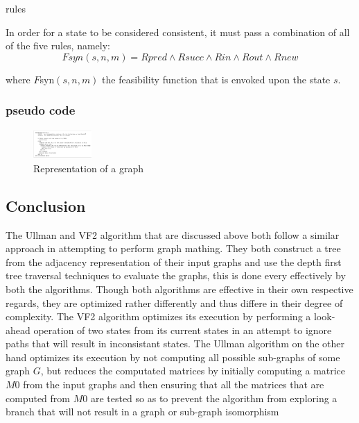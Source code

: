 {rules}

 In order for a state to be considered consistent, it must pass a combination of all of the five rules, namely:
	\begin{equation}
		Fsyn(s,n,m) = Rpred \wedge Rsucc \wedge Rin \wedge Rout \wedge Rnew 
	\end{equation} 

where $F${\tiny syn}$(s,n,m)$ the feasibility function that is envoked upon the state $s$.

\subsubsection{pseudo code}
	\begin{figure}[H]
	  \begin{center}
		  \includegraphics[width=0.2\textwidth]{VF2pseudo}
	  \end{center}    
	  \caption{Representation of a graph}
	  \label{fig:vf2pseudo}
	\end{figure} 

 \subsection{Conclusion}

 The Ullman and VF2 algorithm that are discussed above both follow a similar approach in attempting to perform graph mathing. They both construct a tree from the adjacency representation of their input graphs and use the depth first tree traversal techniques to evaluate the graphs, this is done every effectively by both the algorithms.\newline\newline
 Though both algorithms are effective in their own respective regards, they are optimized rather differently and thus differe in their degree of complexity. The VF2 algorithm optimizes its execution by performing a look-ahead operation of two states from its current states in an attempt to ignore paths that will result in inconsistant states.\newline\newline
 The Ullman algorithm on the other hand optimizes its execution by not computing all possible sub-graphs of some graph $G$, but reduces the computated matrices by initially computing a matrice $M0$ from the input graphs and then ensuring that all the matrices that are computed from $M0$ are tested so as to prevent the algorithm from exploring a branch that will not result in a graph or sub-graph isomorphism
\newpage


